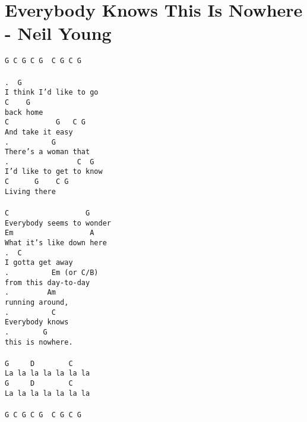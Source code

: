 \newpage
\section{Everybody Knows This Is Nowhere - Neil Young}
\label{Everybody Knows This Is Nowhere - Neil Young}
\texttt{G\ C\ G\ C\ G\ \ C\ G\ C\ G\\
\\
.\ \ G\ \ \ \ \ \ \ \\
I\ think\ I'd\ like\ to\ go\\
C\ \ \ \ G\\
back\ home\\
C\ \ \ \ \ \ \ \ \ \ \ G\ \ \ C\ G\\
And\ take\ it\ easy\\
.\ \ \ \ \ \ \ \ \ \ G\ \ \ \ \\
There's\ a\ woman\ that\\
.\ \ \ \ \ \ \ \ \ \ \ \ \ \ \ \ C\ \ G\\
I'd\ like\ to\ get\ to\ know\\
C\ \ \ \ \ \ G\ \ \ \ C\ G\\
Living\ there\\
\\
C\ \ \ \ \ \ \ \ \ \ \ \ \ \ \ \ \ \ G\\
Everybody\ seems\ to\ wonder\\
Em\ \ \ \ \ \ \ \ \ \ \ \ \ \ \ \ \ \ A\\
What\ it's\ like\ down\ here\\
.\ \ C\\
I\ gotta\ get\ away\\
.\ \ \ \ \ \ \ \ \ \ Em (or C/B) \ \\
from\ this\ day-to-day\\
.\ \ \ \ \ \ \ \ \ Am\\
running\ around,\\
.\ \ \ \ \ \ \ \ \ \ C\ \ \ \\
Everybody\ knows\\
.\ \ \ \ \ \ \ \ G\ \ \ \ \ \ \ \ \ \ \\
this\ is\ nowhere.\\
\\
G\ \ \ \ \ D\ \ \ \ \ \ \ \ C\\
La\ la\ la\ la\ la\ la\ la\\
G\ \ \ \ \ D\ \ \ \ \ \ \ \ C\\
La\ la\ la\ la\ la\ la\ la\\
\\
G\ C\ G\ C\ G\ \ C\ G\ C\ G\\
}
